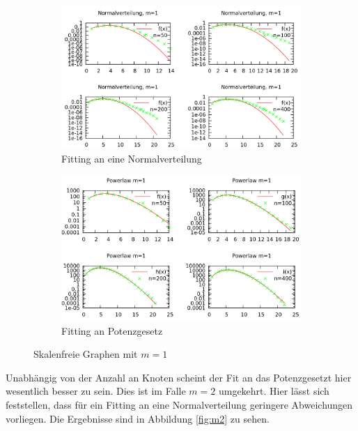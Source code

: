 \documentclass[10pt]{article}
\begin{document}
\begin{figure}[h!]
\begin{subfigure}{.5\textwidth}
  \centering
  \includegraphics[width=1\linewidth]{../Results/Normal_M1_logscale.png}
  \caption{Fitting an eine Normalverteilung}
  \label{fig:sfig1}
\end{subfigure}%
\begin{subfigure}{.5\textwidth}
  \centering
  \includegraphics[width=1\linewidth]{../Results/Power_M1_logscale.png}
  \caption{Fitting an Potenzgesetz}
  \label{fig:sfig2}
\end{subfigure}
\caption{Skalenfreie Graphen mit $m=1$}
\label{fig:m1}
\end{figure}

Unabhängig von der Anzahl an Knoten scheint der Fit an das Potenzgesetzt hier wesentlich besser zu sein. Dies ist im Falle $m=2$ umgekehrt. Hier lässt sich feststellen, dass für ein Fitting an eine Normalverteilung geringere Abweichungen vorliegen. Die Ergebnisse sind in Abbildung \ref{fig:m2} zu sehen.
\end{document}
